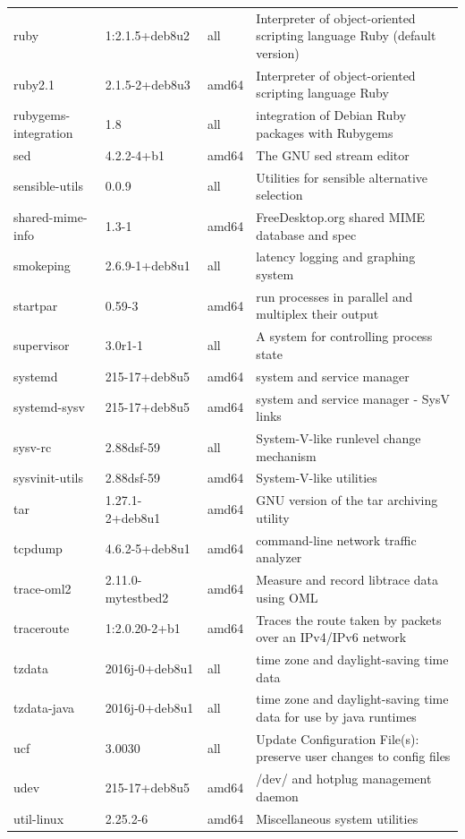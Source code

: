 \documentclass[a4paper,10pt]{article}
\begin{document}
\begin{appendices}
{\begin{longtable}{p{3.25cm}@{\hspace{0.25cm}}p{4cm}@{\hspace{0.25cm}}l@{\hspace{0.25cm}}p{7cm}}
ruby	&	1:2.1.5+deb8u2	&	all	&	Interpreter of object-oriented scripting language Ruby (default version)	\\
ruby2.1	&	2.1.5-2+deb8u3	&	amd64	&	Interpreter of object-oriented scripting language Ruby	\\
rubygems-integration	&	1.8	&	all	&	integration of Debian Ruby packages with Rubygems	\\
sed	&	4.2.2-4+b1	&	amd64	&	The GNU sed stream editor	\\
sensible-utils	&	0.0.9	&	all	&	Utilities for sensible alternative selection	\\
shared-mime-info	&	1.3-1	&	amd64	&	FreeDesktop.org shared MIME database and spec	\\
smokeping	&	2.6.9-1+deb8u1	&	all	&	latency logging and graphing system	\\
startpar	&	0.59-3	&	amd64	&	run processes in parallel and multiplex their output	\\
supervisor	&	3.0r1-1	&	all	&	A system for controlling process state	\\
systemd	&	215-17+deb8u5	&	amd64	&	system and service manager	\\
systemd-sysv	&	215-17+deb8u5	&	amd64	&	system and service manager - SysV links	\\
sysv-rc	&	2.88dsf-59	&	all	&	System-V-like runlevel change mechanism	\\
sysvinit-utils	&	2.88dsf-59	&	amd64	&	System-V-like utilities	\\
tar	&	1.27.1-2+deb8u1	&	amd64	&	GNU version of the tar archiving utility	\\
tcpdump	&	4.6.2-5+deb8u1	&	amd64	&	command-line network traffic analyzer	\\
trace-oml2	&	2.11.0-mytestbed2	&	amd64	&	Measure and record libtrace data using OML	\\
traceroute	&	1:2.0.20-2+b1	&	amd64	&	Traces the route taken by packets over an IPv4/IPv6 network	\\
tzdata	&	2016j-0+deb8u1	&	all	&	time zone and daylight-saving time data	\\
tzdata-java	&	2016j-0+deb8u1	&	all	&	time zone and daylight-saving time data for use by java runtimes	\\
ucf	&	3.0030	&	all	&	Update Configuration File(s): preserve user changes to config files	\\
udev	&	215-17+deb8u5	&	amd64	&	/dev/ and hotplug management daemon	\\
util-linux	&	2.25.2-6	&	amd64	&	Miscellaneous system utilities	\\

\end{longtable}}
\end{appendices}
\end{document}
